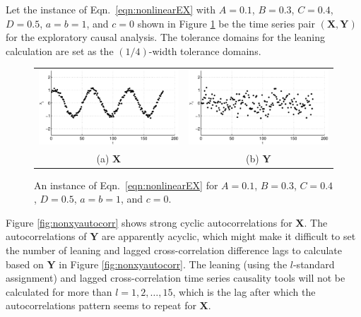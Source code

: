 \documentclass{article}[10pt]
\begin{document}
Let the instance of Eqn.\ \ref{eqn:nonlinearEX} with $A=0.1$, $B=0.3$, $C=0.4$, $D=0.5$, $a=b=1$, and $c=0$ shown in Figure \ref{fig:nonxyplot} be the time series pair $(\mathbf{X},\mathbf{Y})$ for the exploratory causal analysis.  The tolerance domains for the leaning calculation are set as the $(1/4)$-width tolerance domains.
\begin{figure}[ht]
\begin{tabular}{cc}
\includegraphics[scale=0.5]{NonlinearResponseExample_X.eps} & \includegraphics[scale=0.5]{NonlinearResponseExample_Y.eps} \\
(a) $\mathbf{X}$ & (b) $\mathbf{Y}$
\end{tabular}
\caption{An instance of Eqn.\ \ref{eqn:nonlinearEX} for $A=0.1$, $B=0.3$, $C=0.4$, $D=0.5$, $a=b=1$, and $c=0$.}
\label{fig:nonxyplot}
\end{figure}

Figure \ref{fig:nonxyautocorr} shows strong cyclic autocorrelations for $\mathbf{X}$.  The autocorrelations of $\mathbf{Y}$ are apparently acyclic, which might make it difficult to set the number of leaning and lagged cross-correlation difference lags to calculate based on $\mathbf{Y}$ in Figure \ref{fig:nonxyautocorr}.  The leaning (using the $l$-standard assignment) and lagged cross-correlation time series causality tools will not be calculated for more than $l=1,2,\ldots,15$, which is the lag after which the autocorrelations pattern seems to repeat for $\mathbf{X}$.  
\end{document}
